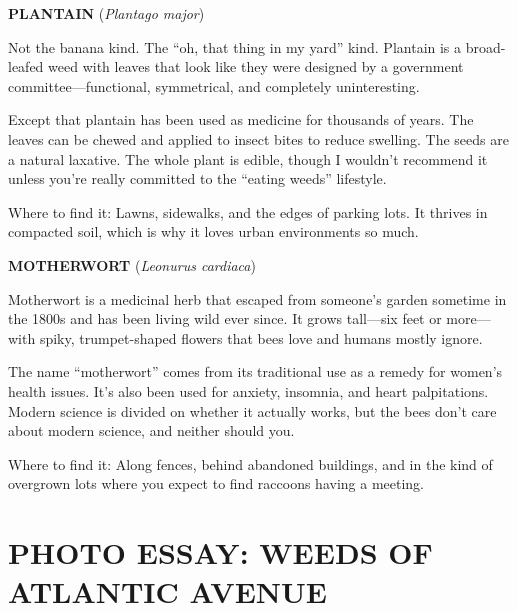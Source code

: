\documentclass[
    language=english,
    doctype=zine,
    institution=none,
]{../../omnilatex}
\begin{document}
\begin{center}
\begin{minipage}{0.9\textwidth}
\vspace{0.3cm}

\textbf{PLANTAIN} (\textit{Plantago major})

Not the banana kind. The ``oh, that thing in my yard'' kind. Plantain is a broad-leafed weed with leaves that look like they were designed by a government committee---functional, symmetrical, and completely uninteresting.

Except that plantain has been used as medicine for thousands of years. The leaves can be chewed and applied to insect bites to reduce swelling. The seeds are a natural laxative. The whole plant is edible, though I wouldn't recommend it unless you're really committed to the ``eating weeds'' lifestyle.

Where to find it: Lawns, sidewalks, and the edges of parking lots. It thrives in compacted soil, which is why it loves urban environments so much.

\vspace{0.3cm}

\textbf{MOTHERWORT} (\textit{Leonurus cardiaca})

Motherwort is a medicinal herb that escaped from someone's garden sometime in the 1800s and has been living wild ever since. It grows tall---six feet or more---with spiky, trumpet-shaped flowers that bees love and humans mostly ignore.

The name ``motherwort'' comes from its traditional use as a remedy for women's health issues. It's also been used for anxiety, insomnia, and heart palpitations. Modern science is divided on whether it actually works, but the bees don't care about modern science, and neither should you.

Where to find it: Along fences, behind abandoned buildings, and in the kind of overgrown lots where you expect to find raccoons having a meeting.

\end{minipage}
\end{center}

\section*{PHOTO ESSAY: WEEDS OF ATLANTIC AVENUE}
\end{document}
